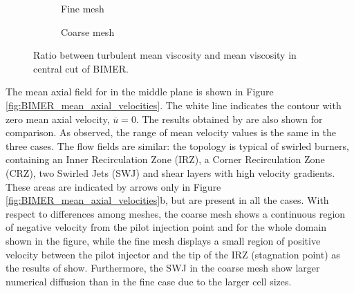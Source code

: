 \clearpage

\begin{figure}[ht]
\centering
\begin{subfigure}[b]{0.45\textwidth}
	\centering
   \caption{Fine mesh}
   \label{fig:field_NU_T_NU_mean_fine}
\end{subfigure}
\begin{subfigure}[b]{0.45\textwidth}
	\centering
   \caption{Coarse mesh}
   \label{fig:field_NU_T_NU_mean_coarse}
\end{subfigure}
\caption[Ratio between turbulent mean viscosity and mean viscosity in central plane]{Ratio between turbulent mean viscosity and mean viscosity in central cut of BIMER.}
\label{fig:BIMER_NU_ratios}
\end{figure}

The mean axial field for in the middle plane is shown in Figure \ref{fig:BIMER_mean_axial_velocities}. The white line indicates the contour with zero mean axial velocity, $\overline{u} = 0$. The results obtained by  are also shown for comparison. As observed, the range of mean velocity values is the same in the three cases. The flow fields are similar: the topology is typical of swirled burners, containing an Inner Recirculation Zone (IRZ), a Corner Recirculation Zone (CRZ), two Swirled Jets (SWJ) and shear layers with high velocity gradients. These areas are indicated by arrows only in Figure \ref{fig:BIMER_mean_axial_velocities}b, but are present in all the cases. With respect to differences among meshes, the coarse mesh shows a continuous region of negative velocity from the pilot injection point and for the whole domain shown in the figure, while the fine mesh displays a small region of positive velocity between the pilot injector and the tip of the IRZ (stagnation point) as the results of  show. Furthermore, the SWJ in the coarse mesh show larger numerical diffusion than in the fine case due to the larger cell sizes.

